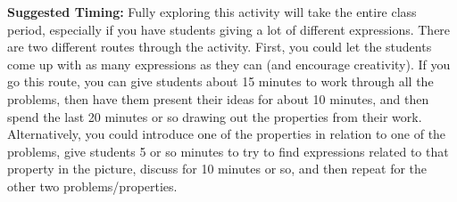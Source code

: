 \documentclass[nooutcomes,noauthor,handout]{ximera}
\begin{document}
\begin{instructorNotes}
{\bf Suggested Timing:} Fully exploring this activity will take the entire class period, especially if you have students giving a lot of different expressions. There are two different routes through the activity. First, you could let the students come up with as many expressions as they can (and encourage creativity). If you go this route, you can give students about 15 minutes to work through all the problems, then have them present their ideas for about 10 minutes, and then spend the last 20 minutes or so drawing out the properties from their work. Alternatively, you could introduce one of the properties in relation to one of the problems, give students 5 or so minutes to try to find expressions related to that property in the picture, discuss for 10 minutes or so, and then repeat for the other two problems/properties.
\end{instructorNotes}
\end{document}
